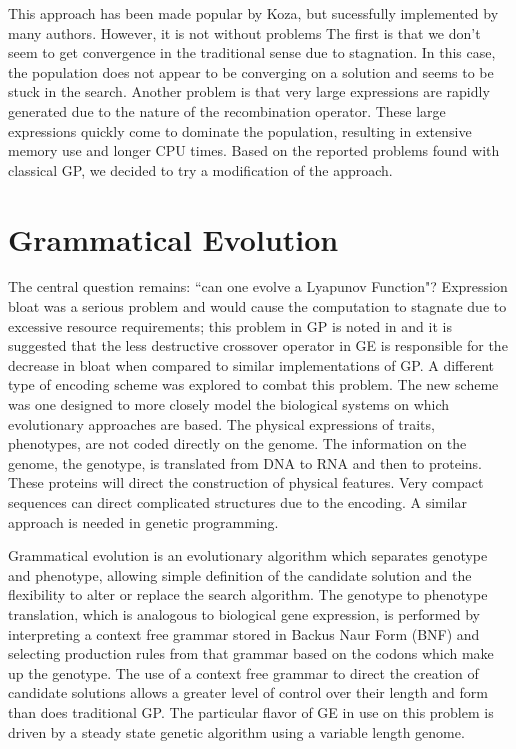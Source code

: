 \documentclass[12pt]{article}
\begin{document}
This approach has been made popular by Koza, but sucessfully
implemented by many authors.  However, it is not without problems The
first is that we don't seem to get convergence in the traditional
sense due to stagnation.  In this case, the population does not appear
to be converging on a solution and seems to be stuck in the search.
Another problem is that very large expressions are rapidly generated
due to the nature of the recombination operator.  These large
expressions quickly come to dominate the population, resulting in
extensive memory use and longer CPU times.  Based on the reported
problems found with classical GP, we decided to try a modification of
the approach.


\section{Grammatical Evolution}

The central question remains: ``can one evolve a Lyapunov Function"?
Expression bloat was a serious problem and would cause the computation
to stagnate due to excessive resource requirements; this problem in GP is
noted in \cite{oneill:1999:hge, ryan:1998:geepal} 
and it is suggested that the less destructive
crossover operator in GE is responsible for the decrease in bloat when
compared to similar implementations of GP. A different type
of encoding scheme was explored to combat this problem.  The new
scheme was one designed to more closely model the biological systems
on which evolutionary approaches are based.  The physical expressions
of traits, phenotypes, are not coded directly on the genome.  The
information on the genome, the genotype, is translated from DNA to RNA
and then to proteins.  These proteins will direct the construction of
physical features.  Very compact sequences can direct complicated
structures due to the encoding.  A similar approach is needed in
genetic programming.

Grammatical evolution is an evolutionary algorithm which separates
genotype and phenotype, allowing simple definition of the candidate
solution and the flexibility to alter or replace the search
algorithm. The genotype to phenotype translation, which is analogous
to biological gene expression, is performed by interpreting a context
free grammar stored in Backus Naur Form (BNF) and selecting production
rules from that grammar based on the codons which make up the
genotype. The use of a context free grammar to direct the creation of
candidate solutions allows a greater level of control over their
length and form than does traditional GP. The particular flavor of GE
in use on this problem is driven by a steady state genetic algorithm
using a variable length genome. 
\end{document}
